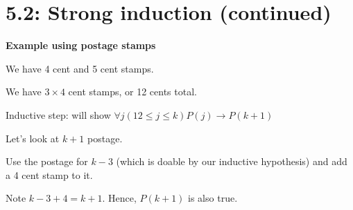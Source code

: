 \documentclass{exam}
\begin{document}
	
    \section{5.2: Strong induction (continued)}
    
    \textbf{Example using postage stamps}
    
    
    We have 4 cent and 5 cent stamps.
    
    We have $3 \times 4$ cent stamps, or 12 cents total.
    
    Inductive step: will show $\forall j (12 \leq j \leq k) P(j) \rightarrow P(k+1)$
    
    Let's look at $k + 1$ postage.
    
    Use the postage for $k - 3$ (which is doable by our inductive hypothesis) and add a 4 cent stamp to it.
    
    Note $k - 3 + 4 = k + 1$. Hence, $P(k+1)$ is also true.
    
    
    
\end{document}
